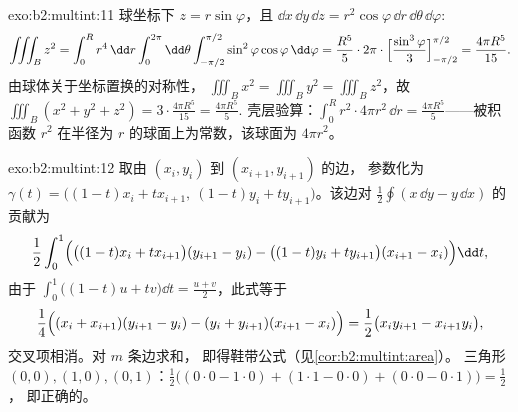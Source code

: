 \begin{solution}{exo:b2:multint:11}
球坐标下 $z = r\sin\varphi$，且 $\dd x\,\dd
y\,\dd z = r^2\cos\varphi\,\dd r\,\dd\theta\,\dd\varphi$:
\[
\iiint_B z^2
= \int_0^R r^4\,\dd r\int_0^{2\pi}\dd\theta
\int_{-\pi/2}^{\pi/2}\sin^2\varphi\cos\varphi\,\dd\varphi
= \frac{R^5}5\cdot2\pi\cdot
\Bigl[\frac{\sin^3\varphi}3\Bigr]_{-\pi/2}^{\pi/2}
= \frac{4\pi R^5}{15}.
\]
由球体关于坐标置换的对称性，
$\iiint_B x^2 = \iiint_B y^2 = \iiint_B z^2$，故 $\iiint_B(x^2
+ y^2 + z^2) = 3\cdot\frac{4\pi R^5}{15} = \frac{4\pi R^5}5$.
壳层验算：$\int_0^R r^2\cdot 4\pi r^2\,\dd r = \frac{4\pi
R^5}5$——被积函数 $r^2$ 在半径为
$r$ 的球面上为常数，该球面为 $4\pi r^2$。
\end{solution}

\begin{solution}{exo:b2:multint:12}
取由 $(x_i, y_i)$ 到 $(x_{i+1}, y_{i+1})$ 的边，
参数化为 $\gamma(t) = \bigl((1-t)x_i + tx_{i+1},\ (1-t)y_i +
ty_{i+1}\bigr)$。该边对
$\frac12\oint(x\,\dd y - y\,\dd x)$ 的贡献为
\[
\frac12\int_0^1\Bigl(\bigl((1-t)x_i +
tx_{i+1}\bigr)(y_{i+1} - y_i) - \bigl((1-t)y_i +
ty_{i+1}\bigr)(x_{i+1} - x_i)\Bigr)\dd t ,
\]
由于 $\int_0^1\bigl((1-t)u + tv\bigr)\dd t = \frac{u +
v}2$，此式等于
\[
\frac14\Bigl((x_i + x_{i+1})(y_{i+1} - y_i) - (y_i +
y_{i+1})(x_{i+1} - x_i)\Bigr)
= \frac12\bigl(x_iy_{i+1} - x_{i+1}y_i\bigr),
\]
交叉项相消。对 $m$ 条边求和，
即得鞋带公式（见\cref{cor:b2:multint:area}）。
三角形 $(0,0), (1,0), (0,1)$：$\frac12\bigl((0\cdot0 - 1\cdot0) +
(1\cdot1 - 0\cdot0) + (0\cdot0 - 0\cdot1)\bigr) = \frac12$，
即正确的。
\end{solution}

